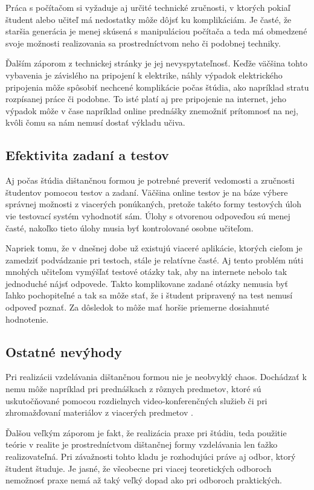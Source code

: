 \documentclass[10pt,twoside,slovak,a4paper]{article}
\begin{document}
	Práca s počítačom si vyžaduje aj určité technické zručnosti, v ktorých pokiaľ študent alebo učiteľ má nedostatky môže dôjsť ku komplikáciám. Je časté, že staršia generácia je menej skúsená s manipuláciou počítača a teda má obmedzené svoje možnosti realizovania sa prostredníctvom neho či podobnej techniky.

	Ďalším záporom z technickej stránky je jej nevyspytateľnosť. Keďže väčšina tohto vybavenia je závislého na pripojení k elektrike, náhly výpadok elektrického pripojenia môže spôsobiť nechcené komplikácie počas štúdia, ako napríklad stratu rozpísanej práce či podobne. To isté platí aj pre pripojenie na internet, jeho výpadok môže v čase napríklad online prednášky znemožniť prítomnosť na nej, kvôli čomu sa nám nemusí dostať výkladu učiva.

\subsection{Efektivita zadaní a testov}
	Aj počas štúdia dištančnou formou je potrebné preveriť vedomosti a zručnosti študentov pomocou testov a zadaní. Väčšina online testov je na báze výbere správnej možnosti z viacerých ponúkaných, pretože takéto formy testových úloh vie testovací systém vyhodnotiť sám. Úlohy s otvorenou odpoveďou sú menej časté, nakoľko tieto úlohy musia byť kontrolované osobne učiteľom. 

	Napriek tomu, že v dnešnej dobe už existujú viaceré aplikácie, ktorých cieľom je zamedziť podvádzanie pri testoch, stále je relatívne časté. Aj tento problém núti mnohých učiteľom vymýšľať testové otázky tak, aby na internete nebolo tak jednoduché nájsť odpovede. Takto komplikovane zadané otázky nemusia byť ľahko pochopiteľné a tak sa môže stať, že i študent pripravený na test nemusí odpoveď poznať. Za dôsledok to môže mať horšie priemerne dosiahnuté hodnotenie. 

\subsection{Ostatné nevýhody}
	Pri realizácii vzdelávania dištančnou formou nie je neobvyklý chaos. Dochádzať k nemu môže napríklad pri prednáškach z rôznych predmetov, ktoré sú uskutočňované pomocou rozdielnych video-konferenčných služieb či pri zhromažďovaní materiálov z viacerých predmetov .

	Ďalšou veľkým záporom je fakt, že realizácia praxe pri štúdiu, teda použitie teórie v realite je prostredníctvom dištančnej formy vzdelávania len ťažko realizovateľná. Pri závažnosti tohto kladu je rozhodujúci práve aj odbor, ktorý študent študuje. Je jasné, že všeobecne pri viacej teoretických odboroch nemožnosť praxe nemá až taký veľký dopad ako pri odboroch praktických.
\end{document}
